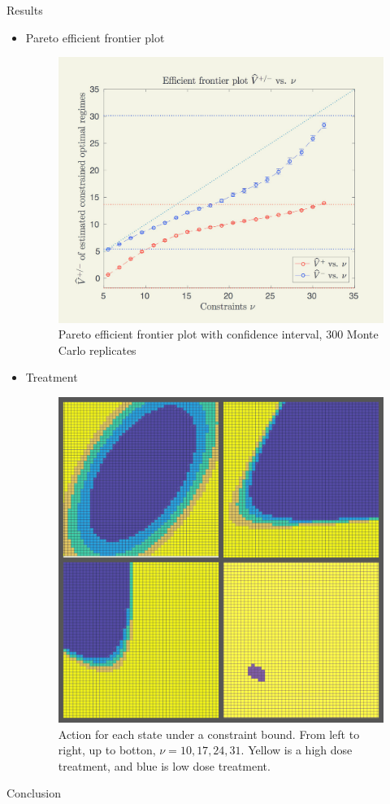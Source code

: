 \documentclass[final,hyperref={pdfpagelabels=false}]{beamer}
\begin{document}
\begin{frame}[t]
\begin{columns}[t]
\begin{column}{.465\textwidth}
\begin{block}{Results}
\begin{itemize}
\item Pareto efficient frontier plot
\begin{figure}
\includegraphics[width=0.7\linewidth]{efficient_plot.png}
\caption{Pareto efficient frontier plot with confidence interval, 300 Monte Carlo replicates}
\end{figure}
\item Treatment
\begin{figure}
\includegraphics[width=0.5\linewidth]{act_dark.jpg}
\caption{Action for each state under a constraint bound. From left to right, up to botton, $\nu= 10, 17, 24, 31$. Yellow is a high dose treatment, and blue is low dose treatment.}
\end{figure}
\end{itemize}     
\end{block}



\begin{block}{Conclusion}


\end{block}
\end{column}
\end{columns}
\end{frame}
\end{document}
